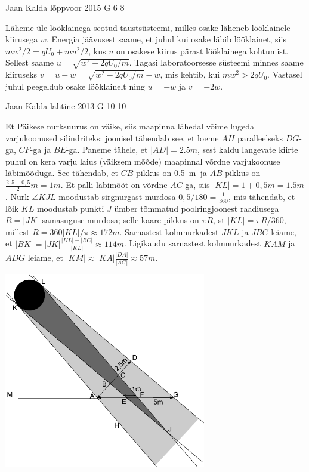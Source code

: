 \documentclass[11pt, twoside]{article}
\begin{document}
{%
{Jaan Kalda} %
{lõppvoor} %
{2015} %
{G 6} %
{8} %
{

\ifSolution
Läheme üle lööklainega seotud taustsüsteemi, milles osake läheneb lööklainele kiirusega $w$. Energia jäävusest saame, et juhul kui osake läbib lööklainet, siis $mw^2/2=qU_0+mu^2/2$, kus $u$ on osakese kiirus pärast lööklainega kohtumist. Sellest saame $u=\sqrt{w^2-2qU_0/m}$. Tagasi laboratoorsesse süsteemi 
minnes saame kiiruseks $v=u-w=\sqrt{w^2-2qU_0/m}-w$, mis kehtib, kui $mw^2>2qU_0$. Vastasel juhul peegeldub osake lööklainelt ning
$u=-w$ ja $v=-2w$.
\fi
}

{Jaan Kalda} %
{lahtine} %
{2013} %
{G 10} %
{10} %
{

\ifSolution
Et Päikese nurksuurus on väike, siis maapinna lähedal võime lugeda varjukoonused silindriteks: joonisel tähendab see, et loeme $AH$ paralleelseks $DG$-ga, $CF$-ga ja $BE$-ga.
Paneme tähele, et $|AD|=\SI{2,5}m$, sest kaldu langevate kiirte puhul on kera varju laius (väiksem mõõde) maapinnal võrdne varjukoonuse läbimõõduga.
See tähendab, et $CB$ pikkus on \SI{0,5}m ja $AB$ pikkus on $\frac{2,5-0,5}2\SI{}m=\SI{1}m$. Et palli läbimõõt on võrdne $AC$-ga, siis $|KL|=1+0,5\SI{}m=\SI{1,5}m$.
Nurk $\angle KJL$ moodustab sirgnurgast murdosa $0,5/180=\frac 1{360}$, mis tähendab, et lõik $KL$ moodustab punkti $J$ ümber tõmmatud poolringjoonest raadiusega $R=|JK|$
samasuguse murdosa; selle kaare pikkus on $\pi R$, st $|KL|=\pi R /360$, millest $R=360|KL|/\pi\approx \SI{172}m$. Sarnastest kolmnurkadest $JKL$ ja $JBC$ leiame, et $|BK|=|JK|\frac{|KL|-|BC|}{|KL|}\approx \SI{114}m$. Ligikaudu sarnastest kolmnurkadest $KAM$ ja $ADG$ leiame, et  $|KM|\approx |KA|\frac{|DA|}{|AG|}\approx \SI{57}m$.

\begin{center}
\includegraphics[width=250pt]{2013-lahg-10-pxike-pall-vari}%
\end{center}
\fi
}

}
\end{document}
